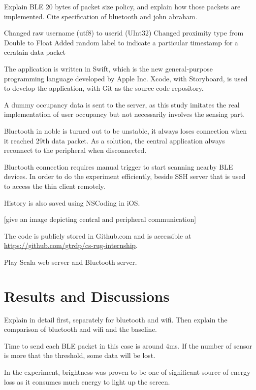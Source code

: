 \documentclass[journal]{vgtc}                %
\begin{document}
Explain BLE 20 bytes of packet size policy, and explain how those packets are implemented. Cite specification of bluetooth and john abraham.

Changed raw username (utf8) to userid (UInt32)
Changed proximity type from Double to Float
Added random label to indicate a particular timestamp for a ceratain data packet

The application is written in Swift, which is the new general-purpose programming language developed by Apple Inc. Xcode, with Storyboard, is used to develop the application, with Git as the source code repository.

A dummy occupancy data is sent to the server, as this study imitates the real implementation of user occupancy but not necessarily involves the sensing part.

Bluetooth in noble is turned out to be unstable, it always loses connection when it reached 29th data packet. As a solution, the central application always reconnect to the peripheral when disconnected.

Bluetooth connection requires manual trigger to start scanning nearby BLE devices. In order to do the experiment efficiently, beside SSH server that is used to access the thin client remotely. 

History is also saved using NSCoding in iOS.

[give an image depicting central and peripheral communication]

The code is publicly stored in Github.com and is accessible at \url{https://github.com/gtrdp/cs-rug-internship}.

Play Scala web server and Bluetooth server.



\section{Results and Discussions} %
\label{sec:results_and_discussion}
Explain in detail first, separately for bluetooth and wifi.
Then explain the comparison of bluetooth and wifi and the baseline.

Time to send each BLE packet in this case is around 4ms. If the number of sensor is more that the threshold, some data will be lost.

In the experiment, brightness was proven to be one of significant source of energy loss as it consumes much energy to light up the screen.
\end{document}
